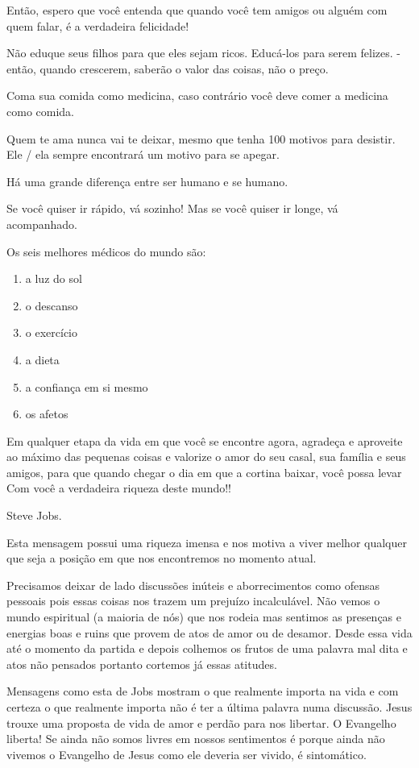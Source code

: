 Então, espero que você entenda que quando você tem amigos ou alguém com quem falar, é a verdadeira felicidade!

Não eduque seus filhos para que eles sejam ricos. Educá-los para serem felizes. - então, quando crescerem, saberão o valor das coisas, não o preço.

Coma sua comida como medicina, caso contrário você deve comer a medicina como comida.

Quem te ama nunca vai te deixar, mesmo que tenha 100 motivos para desistir. Ele / ela sempre encontrará um motivo para se apegar.

Há uma grande diferença entre ser humano e se humano.

Se você quiser ir rápido, vá sozinho! Mas se você quiser ir longe, vá acompanhado.

Os seis melhores médicos do mundo são:

\begin{enumerate}
    \item a luz do sol
    \item o descanso
    \item o exercício
    \item a dieta
    \item a confiança em si mesmo
    \item os afetos
\end{enumerate}

Em qualquer etapa da vida em que você se encontre agora, agradeça e aproveite ao máximo das pequenas coisas e valorize o amor do seu casal, sua família e seus amigos, para que quando chegar o dia em que a cortina baixar, você possa levar Com você a verdadeira riqueza deste mundo!!

Steve Jobs.

\emdash{}Esta mensagem possui uma riqueza imensa e nos motiva a viver melhor qualquer que seja a posição em que nos encontremos no momento atual.

\emdash{}Precisamos deixar de lado discussões inúteis e aborrecimentos como ofensas pessoais pois essas coisas nos trazem um prejuízo incalculável. Não vemos o mundo espiritual (a maioria de nós) que nos rodeia mas sentimos as presenças e energias boas e ruins que provem de atos de amor ou de desamor. Desde essa vida até o momento da partida e depois colhemos os frutos de uma palavra mal dita e atos não pensados portanto cortemos já essas atitudes.

\emdash{}Mensagens como esta de Jobs mostram o que realmente importa na vida e com certeza o que realmente importa não é ter a última palavra numa discussão. Jesus trouxe uma proposta de vida de amor e perdão para nos libertar. O Evangelho liberta! Se ainda não somos livres em nossos sentimentos é porque ainda não vivemos o Evangelho de Jesus como ele deveria ser vivido, é sintomático. 

